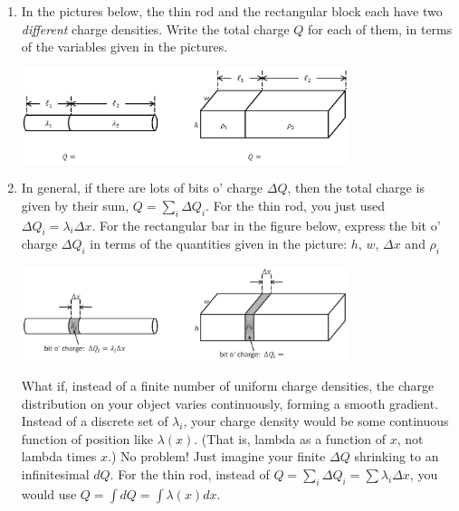 \begin{enumerate}[labparts]
\item In the pictures below, the thin rod and the rectangular block each have two \textit{different} charge densities.  Write the total charge $Q$ for each of them, in terms of the variables given in the pictures.
\begin{center}
\includegraphics[width=0.75\textwidth]{charge_density/fig1.eps}
\end{center}

\item In general, if there are lots of bits o' charge $\Delta Q$, then the total charge is given by their sum, $Q = \sum_i \Delta Q_i$. For the thin rod, you just used $\Delta Q_i = \lambda_i \Delta x$.  For the rectangular bar in the figure below, express the bit o' charge $\Delta Q_i$ in terms of the quantities given in the picture: $h$, $w$, $\Delta x$ and $\rho_i$

\vspace{-0.4 in}
\begin{center}
\includegraphics[width=0.75\textwidth]{charge_density/fig2.eps}
\vspace{-0.2in}
\end{center}
What if, instead of a finite number of uniform charge densities, the charge distribution on your object varies continuously, forming a smooth gradient. Instead of a discrete set of $\lambda_i$, your charge density would be some continuous function of position like $\lambda(x)$.  (That is, lambda as a function of $x$, not lambda times $x$.) No problem! Just imagine your finite $\Delta Q$ shrinking to an infinitesimal $dQ$.  For the thin rod, instead of $Q= \sum_i \Delta Q_i = \sum \lambda_i \Delta x$, you would use $Q = \int dQ = \int\lambda\left(x\right) dx$. 


\end{enumerate}
